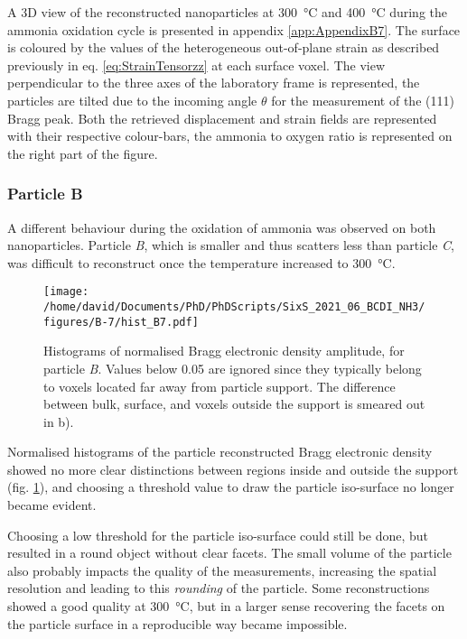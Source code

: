 A 3D view of the reconstructed nanoparticles at \qty{300}{\degreeCelsius} and \qty{400}{\degreeCelsius} during the ammonia oxidation cycle is presented in appendix \ref{app:AppendixB7}.
The surface is coloured by the values of the heterogeneous out-of-plane strain as described previously in eq. \ref{eq:StrainTensorzz} at each surface voxel.
The view perpendicular to the three axes of the laboratory frame is represented, the particles are tilted due to the incoming angle $\theta$ for the measurement of the (111) Bragg peak.
Both the retrieved displacement and strain fields are represented with their respective colour-bars, the ammonia to oxygen ratio is represented on the right part of the figure.

\subsubsection{Particle B}

A different behaviour during the oxidation of ammonia was observed on both nanoparticles.
Particle \textit{B}, which is smaller and thus scatters less than particle \textit{C}, was difficult to reconstruct once the temperature increased to \qty{300}{\degreeCelsius}.

\begin{figure}[!htb]
    \centering
    \texttt{[image: /home/david/Documents/PhD/PhDScripts/SixS\_2021\_06\_BCDI\_NH3/figures/B-7/hist\_B7.pdf]}
    \caption{
        Histograms of normalised Bragg electronic density amplitude, for particle \textit{B}.
        Values below 0.05 are ignored since they typically belong to voxels located far away from particle support.
        The difference between bulk, surface, and voxels outside the support is smeared out in b).
    }
    \label{fig:B7Histo}
\end{figure}

Normalised histograms of the particle reconstructed Bragg electronic density showed no more clear distinctions between regions inside and outside the support (fig. \ref{fig:B7Histo}), and choosing a threshold value to draw the particle iso-surface no longer became evident.

Choosing a low threshold for the particle iso-surface could still be done, but resulted in a round object without clear facets.
The small volume of the particle also probably impacts the quality of the measurements, increasing the spatial resolution and leading to this \textit{rounding} of the particle.
Some reconstructions showed a good quality at \qty{300}{\degreeCelsius}, but in a larger sense recovering the facets on the particle surface in a reproducible way became impossible.


